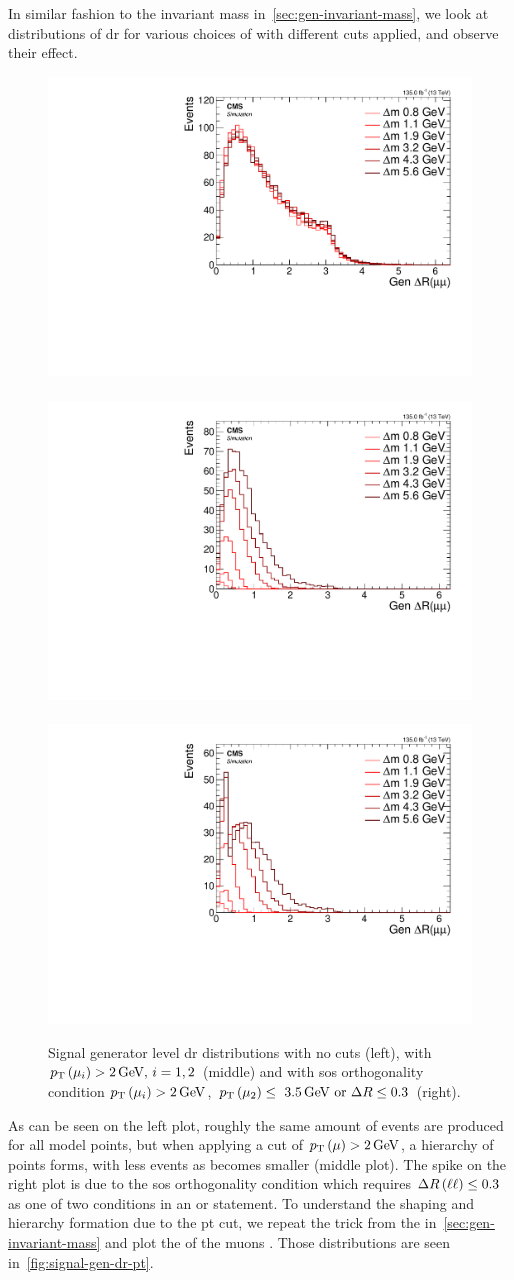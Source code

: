 In similar fashion to the invariant mass in~\ref{sec:gen-invariant-mass}, we look at distributions of \gls{dr} for various choices of \dm with different cuts applied, and observe their effect.

\begin{figure}[!htb]
\centering
\includegraphics[width=0.32\linewidth]{plots/signal_muons_gen/none_gen_deltaR.pdf} \,
\includegraphics[width=0.32\linewidth]{plots/signal_muons_gen/none_gen_deltaR_cut.pdf}  \,
\includegraphics[width=0.32\linewidth]{plots/signal_muons_gen/none_gen_deltaR_orth.pdf} \\
\caption[Signal generator level \DR distributions]{ Signal generator level \gls{dr} distributions with no cuts (left), with $p_{\mathrm{T}}\left(\mu_i\right)>2\,\text{Ge\hspace{-.08em}V},\,i=1,2$ (middle) and with \gls{sos} orthogonality condition $p_{\mathrm{T}}\left(\mu_i\right)>2\,\text{Ge\hspace{-.08em}V}$, $p_{\mathrm{T}}\left(\mu_2\right)\leq~3.5\,\text{Ge\hspace{-.08em}V}\text{ or }\Delta R\leq 0.3$ (right).}
\label{fig:signal-generator-dr}
\end{figure}

As can be seen on the left plot, roughly the same amount of events are produced for all \dm model points, but when applying a cut of $p_{\mathrm{T}}\left(\mu\right)>2\,\text{Ge\hspace{-.08em}V}$, a hierarchy of \dm points forms, with less events as \dm becomes smaller (middle plot). The spike on the right plot is due to the \gls{sos} orthogonality condition which requires $\Delta R\left(\ell\ell\right)\leq 0.3$ as one of two conditions in an or statement.
To understand the shaping and hierarchy formation due to the \gls{pt} cut, we repeat the trick from the \mmumu in~\ref{sec:gen-invariant-mass} and plot the \pt of the muons \vs \drll. Those distributions are seen in~\ref{fig:signal-gen-dr-pt}.

